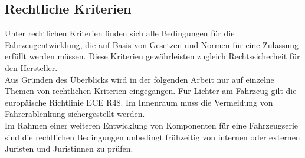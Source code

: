 \subsection{Rechtliche Kriterien}
Unter rechtlichen Kriterien finden sich alle Bedingungen für die Fahrzeugentwicklung, die auf Basis von Gesetzen und Normen für eine Zulassung erfüllt werden müssen. Diese Kriterien gewährleisten zugleich Rechtssicherheit für den Hersteller. \\
Aus Gründen des Überblicks wird in der folgenden Arbeit nur auf einzelne Themen von rechtlichen Kriterien eingegangen. Für Lichter am Fahrzeug gilt die europäische Richtlinie ECE R48. Im Innenraum muss die Vermeidung von Fahrerablenkung sichergestellt werden.\\
Im Rahmen einer weiteren Entwicklung von Komponenten für eine Fahrzeugserie sind die rechtlichen Bedingungen unbedingt frühzeitig von internen oder externen Juristen und Juristinnen zu prüfen.
